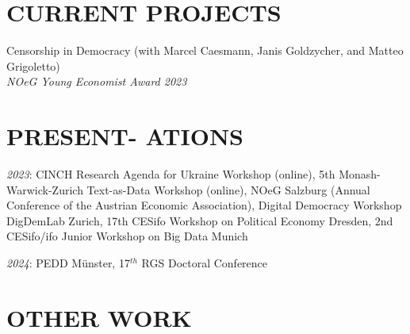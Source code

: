 \documentclass[margin, 12pt]{res} %
\begin{document}
\begin{resume}
		\section{CURRENT PROJECTS}
		
		Censorship in Democracy (with Marcel Caesmann, Janis Goldzycher, and Matteo Grigoletto) \\
		{\sl NOeG Young Economist Award 2023}
		
		
		
		
		\section{PRESENT- ATIONS}
		{\sl2023}: CINCH Research Agenda for Ukraine Workshop (online), 5th Monash-Warwick-Zurich Text-as-Data Workshop (online), NOeG Salzburg (Annual Conference of the Austrian Economic Association), Digital Democracy Workshop DigDemLab Zurich, 17th CESifo Workshop on Political Economy Dresden, 2nd CESifo/ifo Junior Workshop on Big Data Munich
		
		{\sl2024}: PEDD Münster, 17$^{th}$ RGS Doctoral Conference
		
		\section{OTHER WORK}
		
		

\end{resume}
\end{document}
